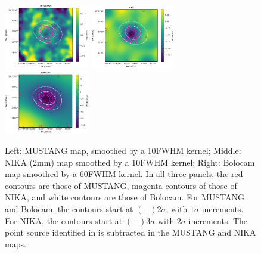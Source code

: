 \documentclass[twocolumn,traditabstract]{aa}
\begin{document}
\begin{figure}[!h]
  \centering
  \includegraphics[width=0.33\textwidth]{NIKA_ml_deproj_figs/MUSTANG_image_and_SNR_contours_cbar.eps}
  \includegraphics[width=0.33\textwidth]{NIKA_ml_deproj_figs/NIKA_image_and_SNR_contours_cbar.eps}
  \includegraphics[width=0.33\textwidth]{NIKA_ml_deproj_figs/BOLOCAM_image_and_SNR_contours_cbar.eps}
  \caption{Left: MUSTANG map, smoothed by a 10\asecs FWHM kernel; Middle: NIKA (2mm) map smoothed by a 10\asecs FWHM kernel;
    Right: Bolocam map smoothed by a 60\asecs FWHM kernel. In all three panels, the red contours are those
    of MUSTANG, magenta contours of those of NIKA, and white contours are those of Bolocam. For MUSTANG and Bolocam, the contours
    start at $(-)2\sigma$, with $1\sigma$ increments. For NIKA, the contours start at $(-)3\sigma$ with $2\sigma$ increments.
    The point source identified in \citet{adam2015} is subtracted in the MUSTANG
    and NIKA maps.}
  \label{fig:clj1227_maps}
\end{figure}




\end{document}
